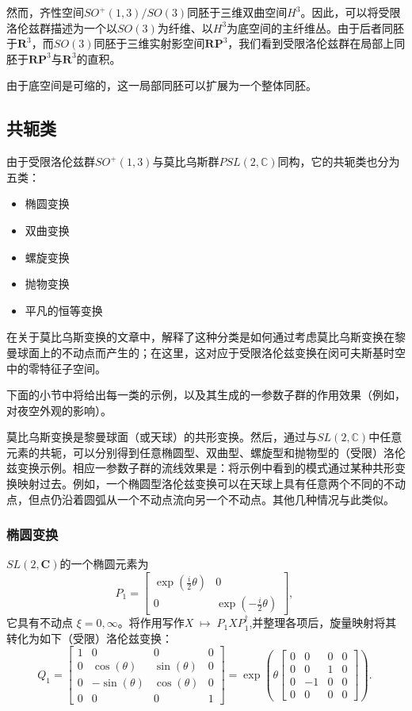 然而，齐性空间$SO^{+}(1,3) / SO(3)$同胚于三维双曲空间$H^{3}$。因此，可以将受限洛伦兹群描述为一个以$SO(3)$为纤维、以$H^{3}$为底空间的主纤维丛。由于后者同胚于$\mathbf{R}^{3}$，而$SO(3)$同胚于三维实射影空间$\mathbf{RP}^{3}$，我们看到受限洛伦兹群在局部上同胚于$\mathbf{RP}^{3}$与$\mathbf{R}^{3}$的直积。

由于底空间是可缩的，这一局部同胚可以扩展为一个整体同胚。
\subsection{共轭类}
由于受限洛伦兹群$SO^{+}(1,3)$与莫比乌斯群$PSL(2,\mathbb{C})$同构，它的共轭类也分为五类：
\begin{itemize}
  \item 椭圆变换
  \item 双曲变换
  \item 螺旋变换
  \item 抛物变换
  \item 平凡的恒等变换
\end{itemize}
在关于莫比乌斯变换的文章中，解释了这种分类是如何通过考虑莫比乌斯变换在黎曼球面上的不动点而产生的；在这里，这对应于受限洛伦兹变换在闵可夫斯基时空中的零特征子空间。

下面的小节中将给出每一类的示例，以及其生成的一参数子群的作用效果（例如，对夜空外观的影响）。

莫比乌斯变换是黎曼球面（或天球）的共形变换。然后，通过与$SL(2,\mathbb{C})$中任意元素的共轭，可以分别得到任意椭圆型、双曲型、螺旋型和抛物型的（受限）洛伦兹变换示例。相应一参数子群的流线效果是：将示例中看到的模式通过某种共形变换映射过去。例如，一个椭圆型洛伦兹变换可以在天球上具有任意两个不同的不动点，但点仍沿着圆弧从一个不动点流向另一个不动点。其他几种情况与此类似。
\subsubsection{椭圆变换}
$SL(2,\mathbf{C})$的一个椭圆元素为
\[
P_{1} =
\begin{bmatrix}
\exp\!\left(\tfrac{i}{2}\theta\right) & 0 \\
0 & \exp\!\left(-\tfrac{i}{2}\theta\right)
\end{bmatrix},~
\]
它具有不动点 $\xi = 0, \infty$。将作用写作$X \;\mapsto\; P_{1} X P_{1}^{\dagger}$,并整理各项后，旋量映射将其转化为如下（受限）洛伦兹变换：
\[
Q_{1} =
\begin{bmatrix}
1 & 0 & 0 & 0 \\
0 & \cos(\theta) & \sin(\theta) & 0 \\
0 & -\sin(\theta) & \cos(\theta) & 0 \\
0 & 0 & 0 & 1
\end{bmatrix}
=
\exp\!\left(
\theta
\begin{bmatrix}
0 & 0 & 0 & 0 \\
0 & 0 & 1 & 0 \\
0 & -1 & 0 & 0 \\
0 & 0 & 0 & 0
\end{bmatrix}
\right).~
\]

